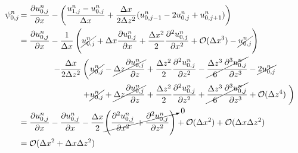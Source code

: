 \documentclass[12pt]{article}
\numberwithin{equation}{section}
\begin{document}
\begin{equation}
    \label{e:local-error-boundary-condition}
    \begin{aligned}
        \psi^n_{0,j} \, &
        \begin{aligned}
            = \frac{\partial u^n_{0,j}}{\partial x} - \left( \frac{u^n_{1,j} - u^n_{0,j}}{\Delta x} + \frac{\Delta x}{2\Delta z^2}(u^n_{0,j-1} - 2u^n_{0,j} + u^n_{0,j+1}) \right)
        \end{aligned}
        \\
        &
        \begin{aligned}
            = \frac{\partial u^n_{0,j}}{\partial x} - \frac{1}{\Delta x} \left( \cancel{u^n_{0,j}} + \Delta x \frac{\partial u^n_{0,j}}{\partial x} + \frac{\Delta x^2}{2}\frac{\partial^2 u^n_{0,j}}{\partial x^2} + \mathcal{O}(\Delta x^3) - \cancel{u^n_{0,j}} \right)
        \end{aligned}
        \\
        &
        \hspace{4em}
        \begin{aligned}
            - \frac{\Delta x}{2 \Delta z^2} \left(\vphantom{\frac{\partial u^n_{0,j}}{\partial z}}\right. & \cancel{u^n_{0,j}} - \cancel{\Delta z \frac{\partial u^n_{0,j}}{\partial z}} + \frac{\Delta z^2}{2}\frac{\partial^2 u^n_{0,j}}{\partial z^2} - \cancel{\frac{\Delta z^3}{6}\frac{\partial^3 u^n_{0,j}}{\partial z^3}} - \cancel{2 u^n_{0,j}} \\
            + & \cancel{u^n_{0,j}} + \cancel{\Delta z \frac{\partial u^n_{0,j}}{\partial z}} + \frac{\Delta z^2}{2}\frac{\partial^2 u^n_{0,j}}{\partial z^2} + \cancel{\frac{\Delta z^3}{6}\frac{\partial^3 u^n_{0,j}}{\partial z^3}} + \mathcal{O}(\Delta z^4) \left. \vphantom{\frac{\partial u^n_{0,j}}{\partial z}} \right)
        \end{aligned}
        \\
        &
        \begin{aligned}
            = \frac{\partial u^n_{0,j}}{\partial x} - \frac{\partial u^n_{0,j}}{\partial x} - \frac{\Delta x}{2} \cancelto{0}{\left( \frac{\partial^2 u^n_{0,j}}{\partial x^2} + \frac{\partial^2 u^n_{0,j}}{\partial z^2} \right)}
            + \mathcal{O}(\Delta x^2) + \mathcal{O}(\Delta x \Delta z^2)
        \end{aligned}
        \\
        &
        \begin{aligned}
            = \mathcal{O}(\Delta x^2 + \Delta x\Delta z^2)
        \end{aligned}
    \end{aligned}
\end{equation}
\end{document}
